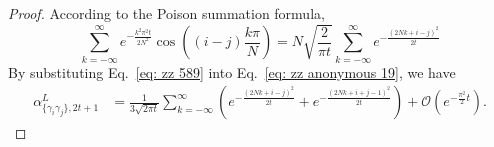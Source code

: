 \documentclass[showpacs,onecolumn,aps,prx,long bibliography,superscriptaddress,notitlepage]{revtex4-1}
\newcommand{\alpl}{\alpha_{\{\gamma_i\gamma_j\}, 2t+1}^{L}}
\begin{document}
\begin{proof}
According to the Poison summation formula, 
\begin{equation}
     \sum_{k=-\infty}^{\infty} e^{-\frac{k^2 \pi^2 t}{2 N^2}}\cos \left((i-j) \frac{k \pi}{N}\right) 
    = N\sqrt{\frac{2}{\pi t}}\sum_{k=-\infty}^{\infty} e^{-\frac{(2Nk+i-j)^2}{2t}}
    \label{eq: zz 589}
\end{equation}
By substituting Eq.~\eqref{eq: zz 589} into Eq.~\eqref{eq: zz anonymous 19}, we have
\begin{align}
\alpl& = \frac{1}{3\sqrt{2\pi t}}  \sum_{k=-\infty}^{\infty} \left(e^{-\frac{(2Nk+i-j)^2}{2t}} + e^{-\frac{(2Nk+i+j-1)^2}{2t}} \right)+\mathcal{O}\left(e^{-\frac{\pi^2}{2}t}\right).
\end{align}


\end{proof}
\end{document}
